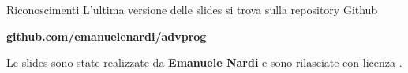 \documentclass[xcolor={dvipsnames, svgnames, x11names, table}, 10pt]{beamer}
\begin{document}
\begin{frame}{Riconoscimenti}
L'ultima versione delle slides si trova sulla repository Github
\begin{center}\Large
    \href{https://www.github.com/emanuelenardi/advprog}{ \textbf{github.com/emanuelenardi/advprog}}
\end{center}

Le slides sono state realizzate da \textbf{Emanuele Nardi} e sono rilasciate con licenza \doclicenseLongName.
\begin{center}\large
    \href{https://creativecommons.org/licenses/by-nc-sa/4.0/deed.it}{\doclicenseIcon}
\end{center}
\end{frame}
\end{document}
